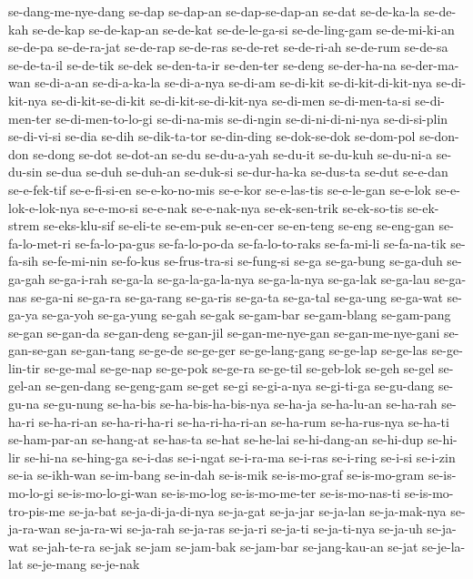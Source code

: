 {se-dang-me-nye-dang se-dap se-dap-an se-dap-se-dap-an se-dat se-de-ka-la
se-de-kah se-de-kap se-de-kap-an se-de-kat se-de-le-ga-si se-de-ling-gam
se-de-mi-ki-an se-de-pa se-de-ra-jat se-de-rap se-de-ras se-de-ret
se-de-ri-ah se-de-rum se-de-sa se-de-ta-il se-de-tik se-dek se-den-ta-ir
se-den-ter se-deng se-der-ha-na se-der-ma-wan se-di-a-an se-di-a-ka-la
se-di-a-nya se-di-am se-di-kit se-di-kit-di-kit-nya se-di-kit-nya
se-di-kit-se-di-kit se-di-kit-se-di-kit-nya se-di-men se-di-men-ta-si
se-di-men-ter se-di-men-to-lo-gi se-di-na-mis se-di-ngin
se-di-ni-di-ni-nya se-di-si-plin se-di-vi-si se-dia se-dih se-dik-ta-tor
se-din-ding se-dok-se-dok se-dom-pol se-don-don se-dong se-dot se-dot-an
se-du se-du-a-yah se-du-it se-du-kuh se-du-ni-a se-du-sin se-dua se-duh
se-duh-an se-duk-si se-dur-ha-ka se-dus-ta se-dut se-e-dan se-e-fek-tif
se-e-fi-si-en se-e-ko-no-mis se-e-kor se-e-las-tis se-e-le-gan se-e-lok
se-e-lok-e-lok-nya se-e-mo-si se-e-nak se-e-nak-nya se-ek-sen-trik
se-ek-so-tis se-ek-strem se-eks-klu-sif se-eli-te se-em-puk se-en-cer
se-en-teng se-eng se-eng-gan se-fa-lo-met-ri se-fa-lo-pa-gus
se-fa-lo-po-da se-fa-lo-to-raks se-fa-mi-li se-fa-na-tik se-fa-sih
se-fe-mi-nin se-fo-kus se-frus-tra-si se-fung-si se-ga se-ga-bung
se-ga-duh se-ga-gah se-ga-i-rah se-ga-la se-ga-la-ga-la-nya se-ga-la-nya
se-ga-lak se-ga-lau se-ga-nas se-ga-ni se-ga-ra se-ga-rang se-ga-ris
se-ga-ta se-ga-tal se-ga-ung se-ga-wat se-ga-ya se-ga-yoh se-ga-yung
se-gah se-gak se-gam-bar se-gam-blang se-gam-pang se-gan se-gan-da
se-gan-deng se-gan-jil se-gan-me-nye-gan se-gan-me-nye-gani se-gan-se-gan
se-gan-tang se-ge-de se-ge-ger se-ge-lang-gang se-ge-lap se-ge-las
se-ge-lin-tir se-ge-mal se-ge-nap se-ge-pok se-ge-ra se-ge-til se-geb-lok
se-geh se-gel se-gel-an se-gen-dang se-geng-gam se-get se-gi se-gi-a-nya
se-gi-ti-ga se-gu-dang se-gu-na se-gu-nung se-ha-bis se-ha-bis-ha-bis-nya
se-ha-ja se-ha-lu-an se-ha-rah se-ha-ri se-ha-ri-an se-ha-ri-ha-ri
se-ha-ri-ha-ri-an se-ha-rum se-ha-rus-nya se-ha-ti se-ham-par-an
se-hang-at se-has-ta se-hat se-he-lai se-hi-dang-an se-hi-dup se-hi-lir
se-hi-na se-hing-ga se-i-das se-i-ngat se-i-ra-ma se-i-ras se-i-ring
se-i-si se-i-zin se-ia se-ikh-wan se-im-bang se-in-dah se-is-mik
se-is-mo-graf se-is-mo-gram se-is-mo-lo-gi se-is-mo-lo-gi-wan se-is-mo-log
se-is-mo-me-ter se-is-mo-nas-ti se-is-mo-tro-pis-me se-ja-bat
se-ja-di-ja-di-nya se-ja-gat se-ja-jar se-ja-lan se-ja-mak-nya
se-ja-ra-wan se-ja-ra-wi se-ja-rah se-ja-ras se-ja-ri se-ja-ti
se-ja-ti-nya se-ja-uh se-ja-wat se-jah-te-ra se-jak se-jam se-jam-bak
se-jam-bar se-jang-kau-an se-jat se-je-la-lat se-je-mang se-je-nak
}
